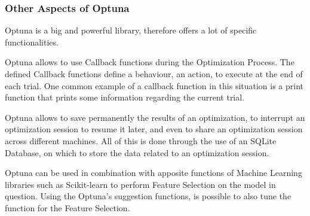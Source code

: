 

\subsubsection{Other Aspects of Optuna}

Optuna is a big and powerful library, therefore offers a lot of specific functionalities.

Optuna allows to use Callback functions during the Optimization Process.
The defined Callback functions define a behaviour, an action, to execute at the end of each trial.
One common example of a callback function in this situation is a print function that prints some information regarding the current trial.

Optuna allows to save permanently the results of an optimization, to interrupt an optimization session to resume it later, and even to share an optimization session across different machines.
All of this is done through the use of an SQLite Database, on which to store the data related to an optimization session.

Optuna can be used in combination with apposite functions of Machine Learning libraries such as Scikit-learn to perform Feature Selection on the model in question.
Using the Optuna's suggestion functions, is possible to also tune the function for the Feature Selection.

